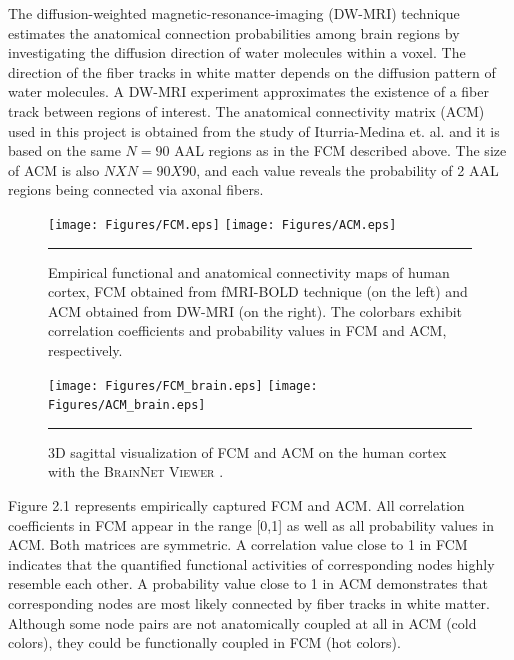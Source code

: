 The diffusion-weighted magnetic-resonance-imaging (DW-MRI) technique estimates the anatomical connection probabilities among brain regions by investigating the diffusion direction of water molecules within a voxel. The direction of the fiber tracks in white matter depends on the diffusion pattern of water molecules. A DW-MRI experiment approximates the existence of a fiber track between regions of interest. The anatomical connectivity matrix (ACM) used in this project is obtained from the study of Iturria-Medina et. al. \citep{ITU08} and it is based on the same $N=90$ AAL regions as in the FCM described above. The size of ACM is also $NXN = 90X90$, and each value reveals the probability of 2 AAL regions being connected via axonal fibers. 
  
\begin{figure}[htbp]
 
  \centering
	 \texttt{[image: Figures/FCM.eps]} 
	 \texttt{[image: Figures/ACM.eps]} 
	
    \rule{35em}{0.5pt}
  \caption[Empirical FCM and ACM]{Empirical functional and anatomical connectivity maps of human cortex, FCM obtained from fMRI-BOLD technique (on the left) and ACM obtained from DW-MRI (on the right). The colorbars exhibit correlation coefficients and probability values in FCM and ACM, respectively. }
  \label{fig:Empirical FCM and ACM}
 	
\end{figure}  

 
\begin{figure}[htbp]
 
  \centering
	 \texttt{[image: Figures/FCM\_brain.eps]} 
	 \texttt{[image: Figures/ACM\_brain.eps]} 
    \rule{35em}{0.5pt}
  \caption[Empirical FCM and ACM in cortex]{3D sagittal visualization of FCM and ACM on the human cortex with the \textsc{BrainNet Viewer} \citep{XYZ13}. } 
  \label{fig:Empirical FCM and ACM in cortex}
 	
\end{figure} 

Figure 2.1 represents empirically captured FCM and ACM. All correlation coefficients in FCM appear in the range [0,1] as well as all probability values in ACM. Both matrices are symmetric. A correlation value close to 1 in FCM indicates that the quantified functional activities of corresponding nodes highly resemble each other. A probability value close to 1 in ACM demonstrates that corresponding nodes are most likely connected by fiber tracks in white matter. Although some node pairs are not anatomically coupled at all in ACM (cold colors), they could be functionally coupled in FCM (hot colors).    

